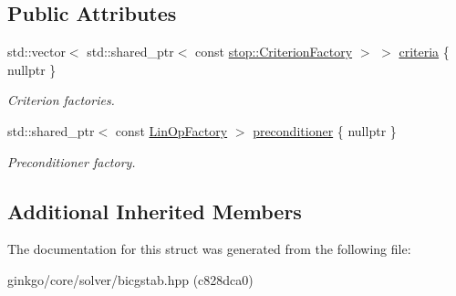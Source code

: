 \subsection*{Public Attributes}
\begin{DoxyCompactItemize}
\item 
\mbox{\label{structgko_1_1solver_1_1Bicgstab_1_1parameters__type_a98e25950c6dcaa68eacc241fbc8bd521}} 
std\+::vector$<$ std\+::shared\+\_\+ptr$<$ const \hyperlink{group__stop_gab12a51109c50b35ec36dc5a393d6a9a0}{stop\+::\+Criterion\+Factory} $>$ $>$ \hyperlink{structgko_1_1solver_1_1Bicgstab_1_1parameters__type_a98e25950c6dcaa68eacc241fbc8bd521}{criteria} \{ nullptr \}
\begin{DoxyCompactList}\small\item\em Criterion factories. \end{DoxyCompactList}\item 
\mbox{\label{structgko_1_1solver_1_1Bicgstab_1_1parameters__type_a758bdb82889e200ff6800e34e9a2d5c4}} 
std\+::shared\+\_\+ptr$<$ const \hyperlink{classgko_1_1LinOpFactory}{Lin\+Op\+Factory} $>$ \hyperlink{structgko_1_1solver_1_1Bicgstab_1_1parameters__type_a758bdb82889e200ff6800e34e9a2d5c4}{preconditioner} \{ nullptr \}
\begin{DoxyCompactList}\small\item\em Preconditioner factory. \end{DoxyCompactList}\end{DoxyCompactItemize}
\subsection*{Additional Inherited Members}


The documentation for this struct was generated from the following file\+:\begin{DoxyCompactItemize}
\item 
ginkgo/core/solver/bicgstab.\+hpp (c828dca0)\end{DoxyCompactItemize}

